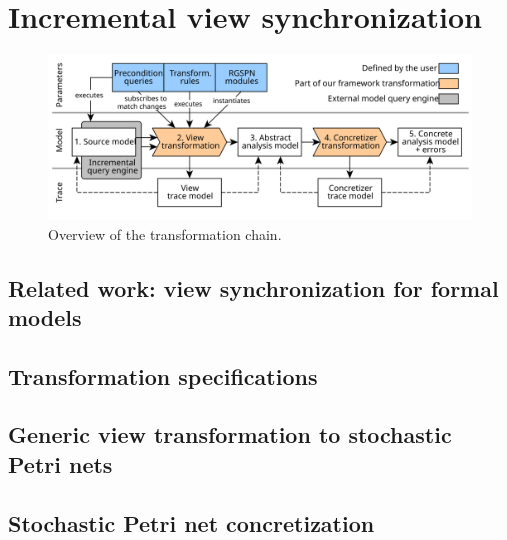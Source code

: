 \chapter{Incremental view synchronization}
\label{chap:transform}


\begin{figure}
  \centering
  \includegraphics[scale=0.9]{figures/transformation_chain}
  \caption{Overview of the transformation chain.}
  \label{fig:transform:overview}
\end{figure}

\section{Related work: view synchronization for formal models}
\label{chap:transform:relwork}

\section{Transformation specifications}
\label{chap:transfrom:specify}

\section{Generic view transformation to stochastic Petri nets}
\label{chap:transform:view}

\section{Stochastic Petri net concretization}
\label{chap:transform:concretizer}